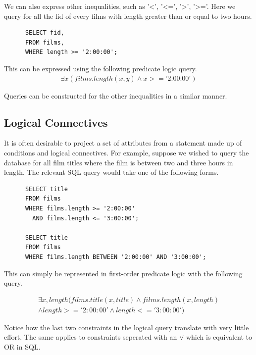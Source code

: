 \documentclass[a4paper, 11pt]{article}
\begin{document}

      We can also express other inequalities, such as '<', '<=', '>', '>='.
      Here we query for all the fid of every films with length greater than or
      equal to two hours.

      \begin{verbatim}
      SELECT fid,
      FROM films,
      WHERE length >= '2:00:00';
      \end{verbatim}

      This can be expressed using the following predicate logic query.
      \begin{gather}
        \exists x(films.length(x, y) \land x >= \text{'2:00:00'}) \label{where5}
      \end{gather}

      Queries can be constructed for the other inequalities in a
      similar manner.

    \subsection{Logical Connectives}

      It is often desirable to project a set of attributes from a statement
      made up of conditions and logical connectives. For example, suppose we
      wished to query the database for all film titles where the film is between 
      two and three hours in length. The relevant SQL query would take one of
      the following forms.

      \begin{verbatim}
      SELECT title
      FROM films
      WHERE films.length >= '2:00:00'
        AND films.length <= '3:00:00';

      SELECT title
      FROM films
      WHERE films.length BETWEEN '2:00:00' AND '3:00:00';
      \end{verbatim}

      This can simply be represented in first-order predicate logic with the
      following query.

      \begin{gather}
        \exists x, length(films.title(x, title) \land films.length(x,
        length)\\
        \land length >= '2:00:00' \land length <= '3:00:00')
      \end{gather}

      Notice how the last two constraints in the logical query translate
      with very little effort. The same applies to constraints seperated with
      an $\lor$ which is equivalent to OR in SQL.
\end{document}
